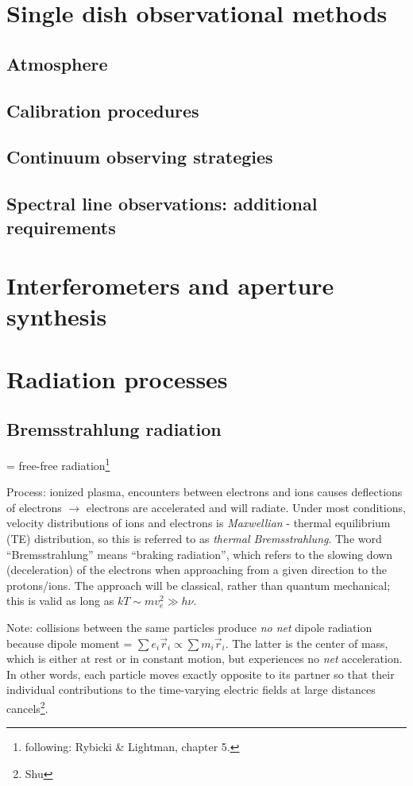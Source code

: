 \documentclass[12pt]{article}
\newcommand{\mar}[1]{\hspace{0pt}\marginpar{-\textcolor{black}{#1}-}}
\begin{document}
\newpage
\section{Single dish observational methods}
\subsection{Atmosphere}
\subsection{Calibration procedures}
\subsection{Continuum observing strategies}
\subsection{Spectral line observations: additional requirements}

\newpage
\section{Interferometers and aperture synthesis}

\newpage
\section{Radiation processes}
\mar{145}
\subsection{Bremsstrahlung radiation}
= free-free radiation\footnote{following: Rybicki \& Lightman, chapter 5.}

Process: ionized plasma, encounters between electrons and ions causes deflections
of electrons $\rightarrow$ electrons are accelerated and will radiate.
Under most conditions, velocity distributions of ions and electrons is
\textit{Maxwellian} - thermal equilibrium (TE) distribution, so this is referred
to as \textit{thermal Bremsstrahlung}. The word ``Bremsstrahlung'' means
``braking radiation'', which refers to the slowing down (deceleration) of the
electrons when approaching from a given direction to the protons/ions. The approach
will be classical, rather than quantum mechanical; this is valid as long as
$ kT \sim mv_{e}^{2} \gg h\nu$.

Note: collisions between the same particles produce \emph{no net} dipole radiation
because dipole moment = $\sum{e_{i}\vec{r}_{i}} \propto \sum{m_{i}\vec{r}_{i}}$.
The latter is the center of mass, which is either at rest or in constant motion,
but experiences no \emph{net} acceleration. In other words, each particle moves
exactly opposite to its partner so that their individual contributions to the
time-varying electric fields at large distances cancels\footnote{Shu}.
\end{document}
